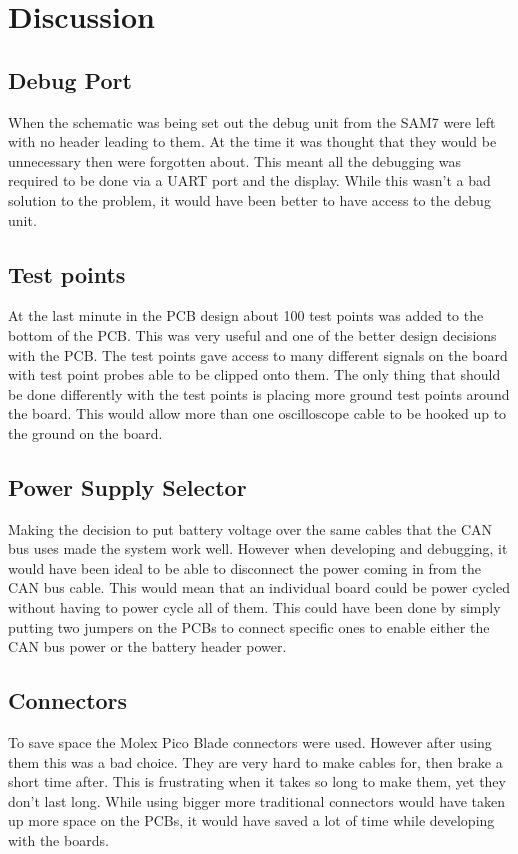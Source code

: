 \section{Discussion}

\subsection{Debug Port}
  When the schematic was being set out the debug unit from the SAM7 were left
  with no header leading to them. At the time it was thought that they would be
  unnecessary then were forgotten about. This meant all the debugging was
  required to be done via a UART port and the display. While this wasn't a bad
  solution to the problem, it would have been better to have access to the debug
  unit.

\subsection{Test points}
  At the last minute in the PCB design about 100 test points was added to the
  bottom of the PCB. This was very useful and one of the better design decisions
  with the PCB. The test points gave access to many different signals on the
  board with test point probes able to be clipped onto them. The only thing that
  should be done differently with the test points is placing more ground test
  points around the board. This would allow more than one oscilloscope cable to
  be hooked up to the ground on the board.

\subsection{Power Supply Selector}
  Making the decision to put battery voltage over the same cables that the CAN
  bus uses made the system work well. However when developing and debugging, it
  would have been ideal to be able to disconnect the power coming in from the
  CAN bus cable. This would mean that an individual board could be power cycled
  without having to power cycle all of them. This could have been done by simply
  putting two jumpers on the PCBs to connect specific ones to enable either the
  CAN bus power or the battery header power.

\subsection{Connectors}
  To save space the Molex Pico Blade \cite{PicoBlade} connectors were used.
  However after using them this was a bad choice. They are very hard to make
  cables for, then brake a short time after. This is frustrating when it takes
  so long to make them, yet they don't last long. While using bigger more
  traditional connectors would have taken up more space on the PCBs, it would
  have saved a lot of time while developing with the boards.

